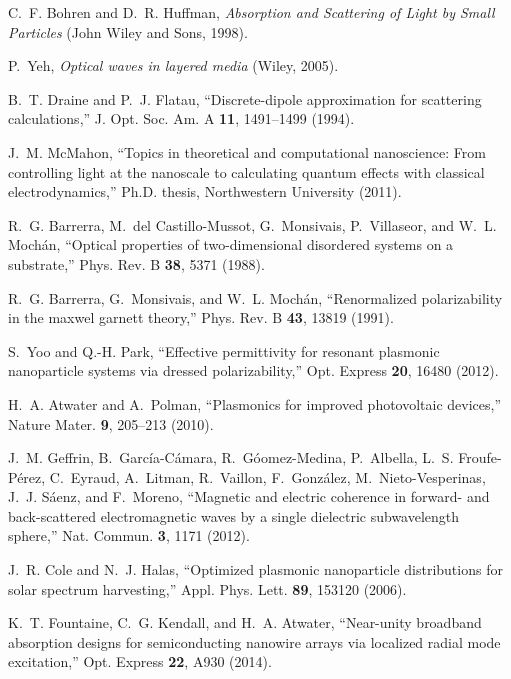 \documentclass[10pt,letterpaper]{article}
\begin{document}
\begin{thebibliography}{100}
C.~F. Bohren and D.~R. Huffman, \emph{Absorption and Scattering of Light by
  Small Particles} (John Wiley and Sons, 1998).

P.~Yeh, \emph{Optical waves in layered media} (Wiley, 2005).

B.~T. Draine and P.~J. Flatau, \enquote{Discrete-dipole approximation for
  scattering calculations,} J. Opt. Soc. Am. A \textbf{11}, 1491--1499 (1994).

J.~M. McMahon, \enquote{Topics in theoretical and computational nanoscience:
  From controlling light at the nanoscale to calculating quantum effects with
  classical electrodynamics,} Ph.D. thesis, Northwestern University (2011).

R.~G. Barrerra, M.~{del Castillo-Mussot}, G.~Monsivais, P.~Villaseor, and W.~L.
  Moch\'{a}n, \enquote{Optical properties of two-dimensional disordered systems
  on a substrate,} Phys. Rev. B \textbf{38}, 5371 (1988).

R.~G. Barrerra, G.~Monsivais, and W.~L. Moch\'{a}n, \enquote{Renormalized
  polarizability in the maxwel garnett theory,} Phys. Rev. B \textbf{43}, 13819
  (1991).

S.~Yoo and Q.-H. Park, \enquote{Effective permittivity for resonant plasmonic
  nanoparticle systems via dressed polarizability,} Opt. Express \textbf{20},
  16480 (2012).

H.~A. Atwater and A.~Polman, \enquote{Plasmonics for improved photovoltaic
  devices,} Nature Mater. \textbf{9}, 205--213 (2010).

J.~M. Geffrin, B.~Garc\'{i}a-C\'{a}mara, R.~G\'{o}omez-Medina, P.~Albella,
  L.~S. Froufe-P\'{e}rez, C.~Eyraud, A.~Litman, R.~Vaillon, F.~Gonz\'{a}lez,
  M.~Nieto-Vesperinas, J.~J. S\'{a}enz, and F.~Moreno, \enquote{Magnetic and
  electric coherence in forward- and back-scattered electromagnetic waves by a
  single dielectric subwavelength sphere,} Nat. Commun. \textbf{3}, 1171
  (2012).

J.~R. Cole and N.~J. Halas, \enquote{Optimized plasmonic nanoparticle
  distributions for solar spectrum harvesting,} Appl. Phys. Lett. \textbf{89},
  153120 (2006).

K.~T. Fountaine, C.~G. Kendall, and H.~A. Atwater, \enquote{Near-unity
  broadband absorption designs for semiconducting nanowire arrays via localized
  radial mode excitation,} Opt. Express \textbf{22}, A930 (2014).


\end{thebibliography}
\end{document}
